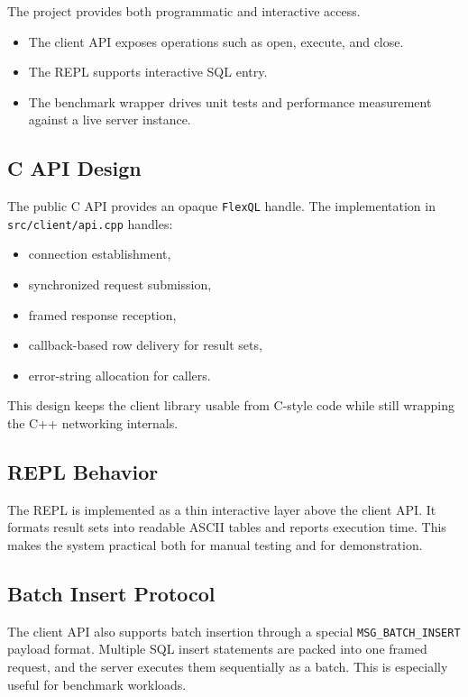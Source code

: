 \documentclass[12pt,a4paper]{article}
\begin{document}
The project provides both programmatic and interactive access.

\begin{itemize}[leftmargin=1.8em]
  \item The client API exposes operations such as open, execute, and close.
  \item The REPL supports interactive SQL entry.
  \item The benchmark wrapper drives unit tests and performance measurement
        against a live server instance.
\end{itemize}

\subsection{C API Design}

The public C API provides an opaque \texttt{FlexQL} handle. The implementation
in \texttt{src/client/api.cpp} handles:

\begin{itemize}[leftmargin=1.8em]
  \item connection establishment,
  \item synchronized request submission,
  \item framed response reception,
  \item callback-based row delivery for result sets,
  \item error-string allocation for callers.
\end{itemize}

This design keeps the client library usable from C-style code while still
wrapping the C++ networking internals.

\subsection{REPL Behavior}

The REPL is implemented as a thin interactive layer above the client API. It
formats result sets into readable ASCII tables and reports execution time. This
makes the system practical both for manual testing and for demonstration.

\subsection{Batch Insert Protocol}

The client API also supports batch insertion through a special
\texttt{MSG\_BATCH\_INSERT} payload format. Multiple SQL insert statements are
packed into one framed request, and the server executes them sequentially as a
batch. This is especially useful for benchmark workloads.
\end{document}
